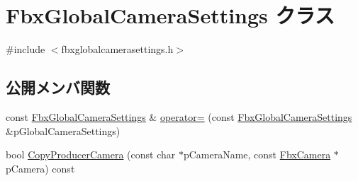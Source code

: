 \hypertarget{class_fbx_global_camera_settings}{}\section{Fbx\+Global\+Camera\+Settings クラス}
\label{class_fbx_global_camera_settings}


{\ttfamily \#include $<$fbxglobalcamerasettings.\+h$>$}

\subsection*{公開メンバ関数}
\begin{DoxyCompactItemize}
\item 
const \hyperlink{class_fbx_global_camera_settings}{Fbx\+Global\+Camera\+Settings} \& \hyperlink{class_fbx_global_camera_settings_aaee942061eedeb6b7e1bae058b1d3ddd}{operator=} (const \hyperlink{class_fbx_global_camera_settings}{Fbx\+Global\+Camera\+Settings} \&p\+Global\+Camera\+Settings)
\item 
bool \hyperlink{class_fbx_global_camera_settings_ad69790f22bd872818ac9d86731833f4f}{Copy\+Producer\+Camera} (const char $\ast$p\+Camera\+Name, const \hyperlink{class_fbx_camera}{Fbx\+Camera} $\ast$p\+Camera) const
\end{DoxyCompactItemize}
